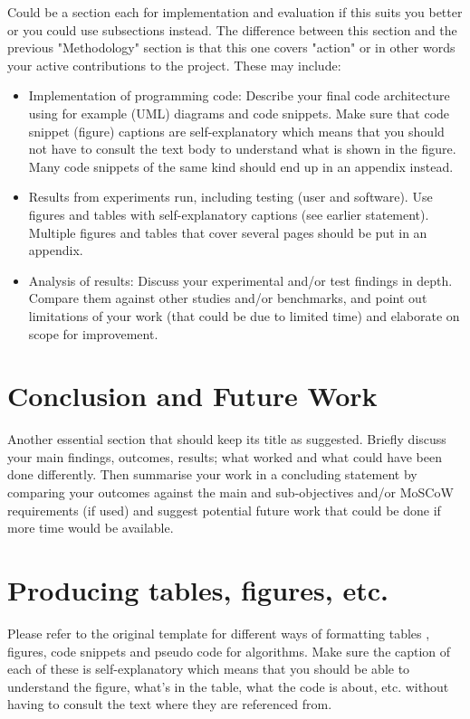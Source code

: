 \documentclass[final]{cmpreport_02}
\begin{document}
Could be a section each for implementation and evaluation if this suits you better or you could use subsections instead. The difference between this section and the previous "Methodology" section is that this one covers "action" or in other words your active contributions to the project. These may include:
\begin{itemize}
	\item Implementation of programming code: Describe your final code architecture using for example (UML) diagrams and code snippets. Make sure that code snippet (figure) captions are self-explanatory which means that you should not have to consult the text body to understand what is shown in the figure. Many code snippets of the same kind should end up in an appendix instead.
	\item Results from experiments run, including testing (user and software). Use figures and tables with self-explanatory captions (see earlier statement). Multiple figures and tables that cover several pages should be put in an appendix.
	\item Analysis of results: Discuss your experimental and/or test findings in depth. Compare them against other studies and/or benchmarks, and point out limitations of your work (that could be due to limited time) and elaborate on scope for improvement.
\end{itemize}

\section{Conclusion and Future Work}

Another essential section that should keep its title as suggested. Briefly discuss your main findings, outcomes, results; what worked and what could have been done differently. Then summarise your work in a concluding statement by comparing your outcomes against the main and sub-objectives and/or MoSCoW requirements (if used) and suggest potential future work that could be done if more time would be available.


\clearpage



\appendix
\clearpage
\section{Producing tables, figures, etc.} \label{sec2}
Please refer to the original template for different ways of formatting tables \cite{PCTut5}, figures, code snippets and pseudo code for algorithms. Make sure the caption of each of these is self-explanatory which means that you should be able to understand the figure, what's in the table, what the code is about, etc. without having to consult the text where they are referenced from.
\end{document}
